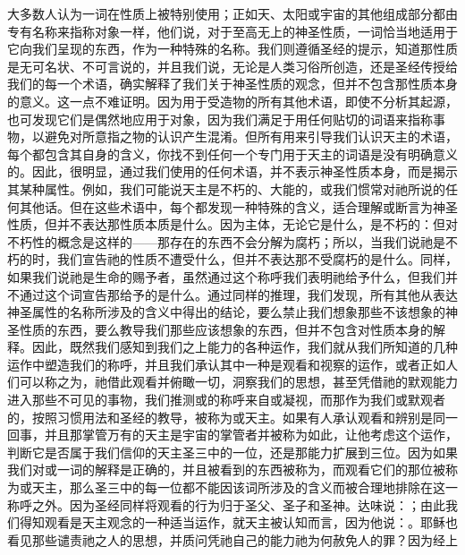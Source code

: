 大多数人认为一词在性质上被特别使用；正如天、太阳或宇宙的其他组成部分都由专有名称来指称对象一样，他们说，对于至高无上的神圣性质，一词恰当地适用于它向我们呈现的东西，作为一种特殊的名称。\newline{}我们则遵循圣经的提示，知道那性质是无可名状、不可言说的，并且我们说，无论是人类习俗所创造，还是圣经传授给我们的每一个术语，确实解释了我们关于神圣性质的观念，但并不包含那性质本身的意义。\newline{}这一点不难证明。因为用于受造物的所有其他术语，即使不分析其起源，也可发现它们是偶然地应用于对象，因为我们满足于用任何贴切的词语来指称事物，以避免对所意指之物的认识产生混淆。\newline{}但所有用来引导我们认识天主的术语，每个都包含其自身的含义，你找不到任何一个专门用于天主的词语是没有明确意义的。因此，很明显，通过我们使用的任何术语，并不表示神圣性质本身，而是揭示其某种属性。\newline{}例如，我们可能说天主是不朽的、大能的，或我们惯常对祂所说的任何其他话。但在这些术语中，每个都发现一种特殊的含义，适合理解或断言为神圣性质，但并不表达那性质本质是什么。因为主体，无论它是什么，是不朽的：但对不朽性的概念是这样的——那存在的东西不会分解为腐朽；所以，当我们说祂是不朽的时，我们宣告祂的性质不遭受什么，但并不表达那不受腐朽的是什么。\newline{}同样，如果我们说祂是生命的赐予者，虽然通过这个称呼我们表明祂给予什么，但我们并不通过这个词宣告那给予的是什么。\newline{}通过同样的推理，我们发现，所有其他从表达神圣属性的名称所涉及的含义中得出的结论，要么禁止我们想象那些不该想象的神圣性质的东西，要么教导我们那些应该想象的东西，但并不包含对性质本身的解释。\newline{}因此，既然我们感知到我们之上能力的各种运作，我们就从我们所知道的几种运作中塑造我们的称呼，并且我们承认其中一种是观看和视察的运作，或者正如人们可以称之为，祂借此观看并俯瞰一切，洞察我们的思想，甚至凭借祂的默观能力进入那些不可见的事物，我们推测或的称呼来自或凝视，而那作为我们或默观者的，按照习惯用法和圣经的教导，被称为或天主。\newline{}如果有人承认观看和辨别是同一回事，并且那掌管万有的天主是宇宙的掌管者并被称为如此，让他考虑这个运作，判断它是否属于我们信仰的天主圣三中的一位，还是那能力扩展到三位。因为如果我们对或一词的解释是正确的，并且被看到的东西被称为，而观看它们的那位被称为或天主，那么圣三中的每一位都不能因该词所涉及的含义而被合理地排除在这一称呼之外。\newline{}因为圣经同样将观看的行为归于圣父、圣子和圣神。达味说：；由此我们得知观看是天主观念的一种适当运作，就天主被认知而言，因为他说：。\newline{}耶稣也看见那些谴责祂之人的思想，并质问凭祂自己的能力祂为何赦免人的罪？因为经上